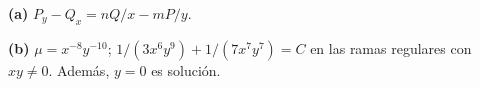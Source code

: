 \noindent\textbf{(a)} $P_y-Q_x=nQ/x-mP/y$.

\noindent\textbf{(b)} $\mu=x^{-8}y^{-10}$; $1/(3x^6y^9)+1/(7x^7y^7)=C$ en las ramas regulares con $xy\ne0$. Además, $y=0$ es solución.

